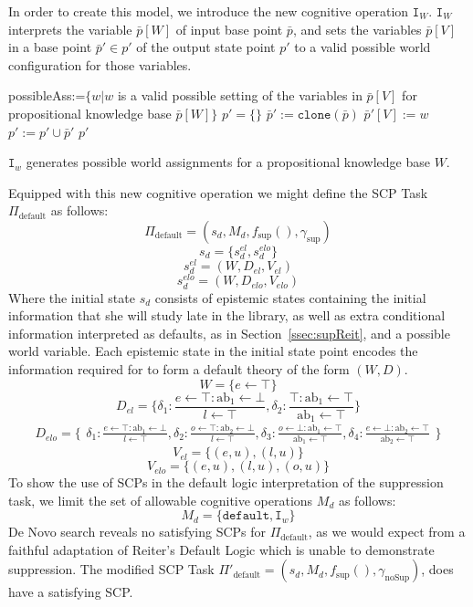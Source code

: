 In order to create this model, we introduce the new cognitive operation $\texttt{I}_W$. $\texttt{I}_W$ interprets the variable $\bar{p}[W]$ of input base point $\bar{p}$, and sets the variables  $\bar{p}[V]$ in a base point $\bar{p}'\in p'$ of the output state point $p'$ to a valid possible world configuration for those variables.


\begin{algorithm}[H]
\SetAlgoLined
{}
{
possibleAss:=$\{w|w$ is a valid possible setting of the variables in $ \bar{p}[V] $ for propositional knowledge base $\bar{p}[W]\}$\;
$p'=\{\}$\;
{
$\bar{p}':=\texttt{clone}(\bar{p})$\;
$\bar{p}'[V]:=w$\;
$p':=p' \cup \bar{p}'$\;
} 
\Return $p'$
}
\caption{$\texttt{I}_w$ generates possible world assignments for a propositional knowledge base $W$.}
 \label{alg:I}
\end{algorithm}

Equipped with this new cognitive operation we might define the SCP Task $\Pi_\text{default}$ as follows:
\[\Pi_\text{default}=(s_d,M_d,f_\text{sup}(),\gamma_\text{sup})\]
\[s_d=\{s_d^{el}, s_d^{elo}\}\]
\[s_d^{el}=(W,D_{el},V_{el})\]
\[s_d^{elo}=(W,D_{elo},V_{elo})\]
Where the initial state $s_d$ consists of epistemic states containing the initial information that she will study late in the library, as well as extra conditional information interpreted as defaults, as in Section~\ref{ssec:supReit}, and a possible world variable. Each epistemic state in the initial state point encodes the information required for to form a default theory of the form $(W,D)$.
\[W=\{e\leftarrow \top\}\]
\[
D_{el}=\{\delta_1:\frac{e\leftarrow \top:\text{ab}_1 \leftarrow \bot}{l\leftarrow\top} ,
\delta_2:\frac{\top:\text{ab}_1 \leftarrow \top}{\text{ab}_1\leftarrow\top}
\}
\]
\[
D_{elo}=\{\begin{matrix}\delta_1:\frac{e\leftarrow \top:\text{ab}_1 \leftarrow \bot}{l\leftarrow\top} ,
\delta_2:\frac{o\leftarrow \top:\text{ab}_2 \leftarrow \bot}{l\leftarrow\top},
\delta_3:\frac{o\leftarrow \bot:\text{ab}_1 \leftarrow \top}{\text{ab}_1\leftarrow\top},
\delta_4:\frac{e\leftarrow \bot:\text{ab}_2 \leftarrow \top}{\text{ab}_2\leftarrow\top}
\end{matrix}\}
\]
\[V_{el}=\{(e,u),(l,u)\}\]
\[V_{elo}=\{(e,u),(l,u), (o,u)\}\]
To show the use of SCPs in the default logic interpretation of the suppression task, we limit the set of allowable cognitive operations $M_d$ as follows:
\[M_d=\{\texttt{default},\texttt{I}_w\}\]
De Novo search reveals no satisfying SCPs for $\Pi_\text{default}$, as we would expect from a faithful adaptation of Reiter's Default Logic which is unable to demonstrate suppression. The modified SCP Task $\Pi'_\text{default}=(s_d,M_d,f_\text{sup}(),\gamma_\text{noSup})$, does have a satisfying SCP.

